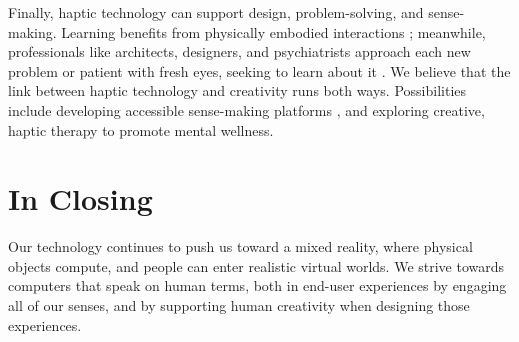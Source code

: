 Finally, haptic technology can support design, problem-solving, and sense-making.
Learning benefits from physically embodied interactions \cite{Papert1980}; meanwhile, professionals like architects, designers, and psychiatrists approach each new problem or patient with fresh eyes, seeking to learn about it \cite{Schon1982}.
We believe that the link between haptic technology and creativity runs both ways.
Possibilities include developing accessible sense-making platforms \cite{Swaminathan2016}, and exploring creative, haptic therapy to promote mental wellness.

%
%
\section{In Closing}
Our technology continues to push us toward a mixed reality, where physical objects compute, and people can enter realistic virtual worlds.
We strive towards computers that speak on human terms, both in end-user experiences by engaging all of our senses, and by supporting human creativity when designing those experiences.




\endinput

